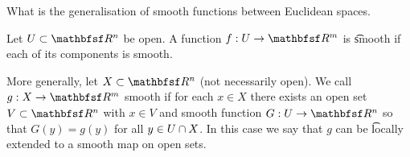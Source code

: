 

What is the generalisation of smooth functions between Euclidean spaces.


Let $U \subset \R^n$ be open.
A function $f: U \to \R^m$ is \t{smooth} if each of its components is smooth.

More generally, let $X \subset \R^n$ (not necessarily open).
We call $g: X \to \R^m$ smooth if for each $x \in X$ there exists an open set $V \subset \R^n$ with $x \in V$ and smooth function $G: U \to \R^n$ so that $G(y) = g(y)$ for all $y \in U \cap X$.
In this case we say that $g$ can be \t{locally extended} to a smooth map on open sets.

\blankpage
